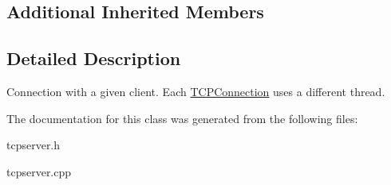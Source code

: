 \subsection*{Additional Inherited Members}


\subsection{Detailed Description}
Connection with a given client. Each \hyperlink{classcppu_1_1TCPConnection}{T\+C\+P\+Connection} uses a different thread. 

The documentation for this class was generated from the following files\+:\begin{DoxyCompactItemize}
\item 
tcpserver.\+h\item 
tcpserver.\+cpp\end{DoxyCompactItemize}
